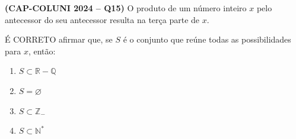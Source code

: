 \textbf{(CAP-COLUNI 2024 -- Q15)} O produto de um número inteiro $x$ pelo antecessor do seu antecessor resulta na terça parte de $x$.

É CORRETO afirmar que, se $S$ é o conjunto que reúne todas as possibilidades para $x$, então:

\begin{enumerate}
	\item $S\subset\mathbb{R}-\mathbb{Q}$
	\item $S=\varnothing$
	\item $S\subset\mathbb{Z}_{-}$
	\item $S\subset\mathbb{N}^{*}$
\end{enumerate}
